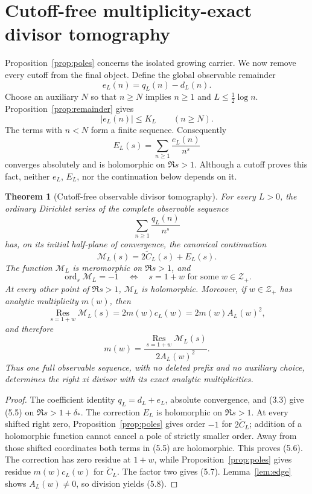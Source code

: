 \documentclass[11pt]{article}
\newtheorem{theorem}{Theorem}[section]
\newcommand{\cZ}{\mathcal Z}
\newcommand{\cM}{\mathcal M}
\newcommand{\ord}{\operatorname{ord}}
\begin{document}
\section{Cutoff-free multiplicity-exact divisor tomography}

Proposition~\ref{prop:poles} concerns the isolated growing carrier.  We now remove every cutoff
from the final object.  Define the global observable remainder
\[
  e_L(n)=q_L(n)-d_L(n).
  \tag{5.1}
\]
Choose an auxiliary $N$ so that $n\ge N$ implies $n\ge1$ and
$L\le\frac12\log n$.  Proposition~\ref{prop:remainder} gives
\[
  |e_L(n)|\le K_L\qquad(n\ge N).
  \tag{5.2}
\]
The terms with $n<N$ form a finite sequence.  Consequently
\[
  E_L(s)=\sum_{n\ge1}\frac{e_L(n)}{n^s}
  \tag{5.3}
\]
converges absolutely and is holomorphic on $\Re s>1$.  Although a cutoff proves this fact, neither
$e_L$, $E_L$, nor the continuation below depends on it.

\begin{theorem}[Cutoff-free observable divisor tomography]\label{thm:tomography}
For every $L>0$, the ordinary Dirichlet series of the complete observable sequence
\[
  \sum_{n\ge1}\frac{q_L(n)}{n^s}
  \tag{5.4}
\]
has, on its initial half-plane of convergence, the canonical continuation
\[
  \cM_L(s)=2\widetilde C_L(s)+E_L(s).
  \tag{5.5}
\]
The function $\cM_L$ is meromorphic on $\Re s>1$, and
\[
  \ord_s\cM_L=-1
  \quad\Longleftrightarrow\quad
  s=1+w\text{ for some }w\in\cZ_+.
  \tag{5.6}
\]
At every other point of $\Re s>1$, $\cM_L$ is holomorphic.  Moreover, if
$w\in\cZ_+$ has analytic multiplicity $m(w)$, then
\[
  \operatorname*{Res}_{s=1+w}\cM_L(s)
  =2m(w)c_L(w)=2m(w)A_L(w)^2,
  \tag{5.7}
\]
and therefore
\[
  m(w)=
  \frac{\operatorname*{Res}_{s=1+w}\cM_L(s)}{2A_L(w)^2}.
  \tag{5.8}
\]
Thus one full observable sequence, with no deleted prefix and no auxiliary choice, determines the
right xi divisor with its exact analytic multiplicities.
\end{theorem}

\begin{proof}
The coefficient identity $q_L=d_L+e_L$, absolute convergence, and (3.3) give (5.5) on
$\Re s>1+\delta_*$.  The correction $E_L$ is holomorphic on $\Re s>1$.  At every shifted right
zero, Proposition~\ref{prop:poles} gives order $-1$ for $2\widetilde C_L$; addition of a
holomorphic function cannot cancel a pole of strictly smaller order.  Away from those shifted
coordinates both terms in (5.5) are holomorphic.  This proves (5.6).  The correction has zero
residue at $1+w$, while Proposition~\ref{prop:poles} gives residue $m(w)c_L(w)$ for
$\widetilde C_L$.  The factor two gives (5.7).  Lemma~\ref{lem:edge} shows $A_L(w)\ne0$, so
division yields (5.8).
\end{proof}
\end{document}
